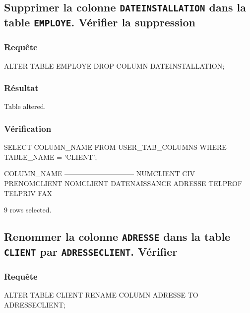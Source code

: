 \documentclass[•]{article}
\begin{document}
\subsection{Supprimer la colonne \texttt{DATEINSTALLATION} dans la table \texttt{EMPLOYE}. Vérifier la suppression}
\subsubsection{Requête}
\begin{sql}
ALTER TABLE EMPLOYE DROP COLUMN DATEINSTALLATION;
\end{sql}
\subsubsection{Résultat}
\begin{sql}
Table altered.
\end{sql}
\subsubsection{Vérification}
\begin{sql}
SELECT COLUMN_NAME FROM USER_TAB_COLUMNS WHERE TABLE_NAME = 'CLIENT';

COLUMN_NAME                                                                     
------------------------------                                                  
NUMCLIENT                                                                       
CIV                                                                             
PRENOMCLIENT                                                                    
NOMCLIENT                                                                       
DATENAISSANCE                                                                   
ADRESSE                                                                         
TELPROF                                                                         
TELPRIV                                                                         
FAX                                                                             

9 rows selected.
\end{sql}
\subsection{Renommer la colonne \texttt{ADRESSE} dans la table \texttt{CLIENT} par \texttt{ADRESSECLIENT}. Vérifier}
\subsubsection{Requête}
\begin{sql}
ALTER TABLE CLIENT RENAME COLUMN ADRESSE TO ADRESSECLIENT;
\end{sql}
\end{document}
